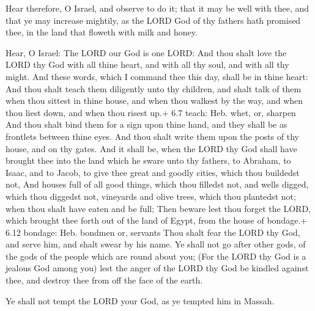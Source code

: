  Hear therefore, O Israel, and observe to do it; that it
may be well with thee, and that ye may increase mightily, as the LORD
God of thy fathers hath promised thee, in the land that floweth with
milk and honey.

 Hear, O Israel: The LORD our God is one LORD: 
And thou shalt love the LORD thy God with all thine heart, and with all
thy soul, and with all thy might.  And these words, which I
command thee this day, shall be in thine heart:  And thou
shalt teach them diligently unto thy children, and shalt talk of them
when thou sittest in thine house, and when thou walkest by the way, and
when thou liest down, and when thou risest up.+ 6.7 teach: Heb. whet,
or, sharpen  And thou shalt bind them for a sign upon thine
hand, and they shall be as frontlets between thine eyes. 
And thou shalt write them upon the posts of thy house, and on thy gates.
 And it shall be, when the LORD thy God shall have brought
thee into the land which he sware unto thy fathers, to Abraham, to
Isaac, and to Jacob, to give thee great and goodly cities, which thou
buildedst not,  And houses full of all good things, which
thou filledst not, and wells digged, which thou diggedst not, vineyards
and olive trees, which thou plantedst not; when thou shalt have eaten
and be full;  Then beware lest thou forget the LORD, which
brought thee forth out of the land of Egypt, from the house of bondage.+
6.12 bondage: Heb. bondmen or, servants  Thou shalt fear
the LORD thy God, and serve him, and shalt swear by his name.
 Ye shall not go after other gods, of the gods of the
people which are round about you;  (For the LORD thy God is
a jealous God among you) lest the anger of the LORD thy God be kindled
against thee, and destroy thee from off the face of the earth.

 Ye shall not tempt the LORD your God, as ye tempted him
in Massah.

